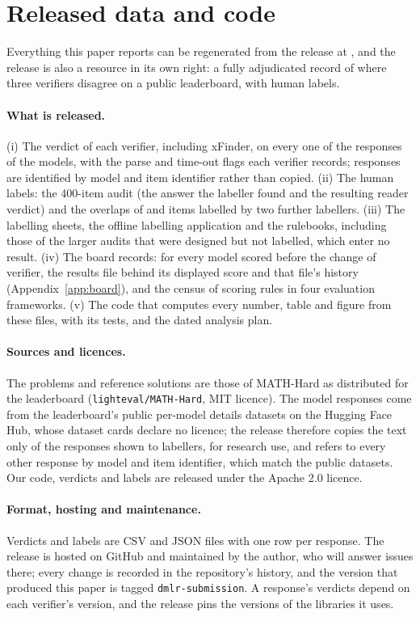 \section{Released data and code}
\label{sec:release}

Everything this paper reports can be regenerated from the release at \CodeURL{}, and the release
is also a resource in its own right: a fully adjudicated record of where three verifiers disagree on
a public leaderboard, with human labels.

\paragraph{What is released.}
(i) The verdict of each verifier, including xFinder, on every one of the \NumRows{} responses of the
\NumModels{} models, with the parse and time-out flags each verifier records; responses are identified by model and item identifier rather than copied.
(ii) The human labels: the 400-item audit (the answer the labeller found and the resulting reader
verdict) and the overlaps of \LabTwoN{} and \LabThreeN{} items labelled by two further labellers.
(iii) The labelling sheets, the offline labelling application and the rulebooks, including those of
the larger audits that were designed but not labelled, which enter no result.
(iv) The board records: for every model scored before the change of verifier, the results file
behind its displayed score and that file's history (Appendix~\ref{app:board}), and the census of
scoring rules in four evaluation frameworks.
(v) The code that computes every number, table and figure from these files, with its tests, and the
dated analysis plan.

\paragraph{Sources and licences.}
The problems and reference solutions are those of MATH-Hard as distributed for the leaderboard
(\texttt{lighteval/MATH-Hard}, MIT licence). The model responses come from the leaderboard's public
per-model details datasets on the Hugging Face Hub, whose dataset cards declare no licence; the
release therefore copies the text only of the responses shown to labellers, for research use, and
refers to every other response by model and item identifier, which match the public datasets. Our code, verdicts and labels are released under the Apache 2.0 licence.

\paragraph{Format, hosting and maintenance.}
Verdicts and labels are CSV and JSON files with one row per response. The release is hosted on
GitHub and maintained by the author, who will answer issues there; every change is recorded in the
repository's history, and the version that produced this paper is tagged
\texttt{dmlr-submission}. A response's verdicts depend on each verifier's version, and the release
pins the versions of the libraries it uses.

